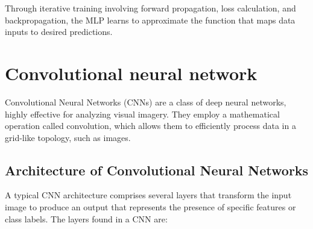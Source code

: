 Through iterative training involving forward propagation, loss calculation, and backpropagation, the MLP learns to approximate the function that maps data inputs to desired predictions.






























\section{Convolutional neural network}
Convolutional Neural Networks (CNNs) \cite{convolutional_neural_network} are a class of deep neural networks, highly effective for analyzing visual imagery. They employ a mathematical operation called convolution, which allows them to efficiently process data in a grid-like topology, such as images.

\subsection{Architecture of Convolutional Neural Networks}
A typical CNN architecture comprises several layers that transform the input image to produce an output that represents the presence of specific features or class labels. The layers found in a CNN are:

